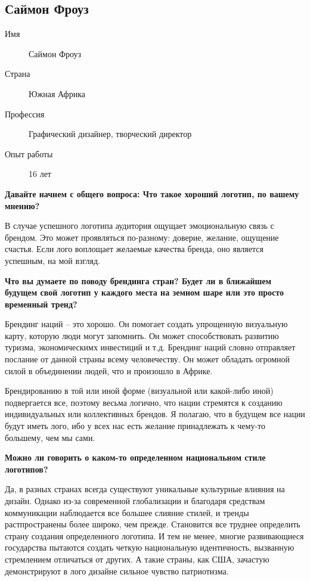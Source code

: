 \clearpage
\subsection{Саймон Фроуз}

\begin{description}
\item[Имя] Саймон Фроуз
\item[Страна] Южная Африка
\item[Профессия] Графический дизайнер, творческий директор
\item[Опыт работы] 16 лет
\end{description}

\textbf{Давайте начнем с общего вопроса: Что такое хороший логотип, по вашему мнению?}

В случае успешного логотипа аудитория ощущает эмоциональную связь с брендом. Это может проявляться по-разному: доверие, желание, ощущение счастья. Если лого воплощает желаемые качества бренда, оно является успешным, на мой взгляд.


\textbf{Что вы думаете по поводу брендинга стран? Будет ли в ближайшем будущем свой логотип у каждого места на земном шаре или это просто временный тренд?}

Брендинг наций – это хорошо. Он помогает создать упрощенную визуальную карту, которую люди могут запомнить. Он может способствовать развитию туризма, экономическимх инвестиций и т.д. Брендинг наций словно отправляет послание от данной страны всему человечеству. Он может обладать огромной силой в объединении людей, что и произошло в Африке.

Брендированию в той или иной форме (визуальной или какой-либо иной) подвергается все, поэтому весьма логично, что нации стремятся к созданию индивидуальных \autocite{link:southafrica} или коллективных \autocite{link:europeanunion} брендов. Я полагаю, что в будущем все нации будут иметь лого, ибо у всех нас есть желание принадлежать к чему-то большему, чем мы сами. 


\textbf{Можно ли говорить о каком-то определенном национальном стиле логотипов?}

Да, в разных странах всегда существуют уникальные культурные влияния на дизайн. Однако из-за современной глобализации и благодаря средствам коммуникации наблюдается все большее слияние стилей, и тренды растпространены более широко, чем прежде. Становится все труднее определить страну создания определенного логотипа. И тем не менее, многие развивающиеся государства пытаются создать четкую национальную идентичность, вызванную стремлением отличаться от других. А такие страны, как США, зачастую демонстрируют в лого дизайне  сильное чувство патриотизма. 


